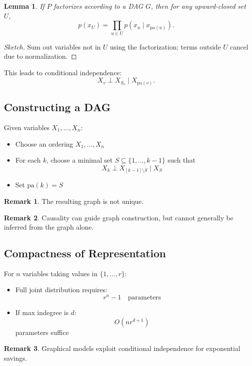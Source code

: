 \documentclass[12pt,oneside]{book}
\numberwithin{equation}{section}
\theoremstyle{definition}
\newtheorem{remark}{Remark}[section]
\theoremstyle{plain}
\newtheorem{lemma}{Lemma}[section]
\theoremstyle{remark}
\begin{document}
\begin{lemma}
If $P$ factorizes according to a DAG $G$, then for any upward-closed set $U$,
\[
p(x_U) = \prod_{u \in U} p(x_u \mid x_{\mathrm{pa}(u)}).
\]
\end{lemma}

\begin{proof}[Sketch]
Sum out variables not in $U$ using the factorization; terms outside $U$ cancel due to normalization.
\end{proof}

This leads to conditional independence:
\[
X_v \perp X_{S_v} \mid X_{\mathrm{pa}(v)}.
\]


\subsection{Constructing a DAG}

Given variables $X_1,\dots,X_n$:

\begin{itemize}
\item Choose an ordering $X_1,\dots,X_n$
\item For each $k$, choose a minimal set $S \subseteq \{1,\dots,k-1\}$ such that
\[
X_k \perp X_{[k-1]\setminus S} \mid X_S
\]
\item Set $\mathrm{pa}(k) = S$
\end{itemize}

\begin{remark}
The resulting graph is not unique.
\end{remark}

\begin{remark}
Causality can guide graph construction, but cannot generally be inferred from the graph alone.
\end{remark}


\subsection{Compactness of Representation}

For $n$ variables taking values in $\{1,\dots,r\}$:

\begin{itemize}
\item Full joint distribution requires:
\[
r^n - 1 \quad \text{parameters}
\]
\item If max indegree is $d$:
\[
O(n r^{d+1})
\]
parameters suffice
\end{itemize}

\begin{remark}
Graphical models exploit conditional independence for exponential savings.
\end{remark}
\end{document}
